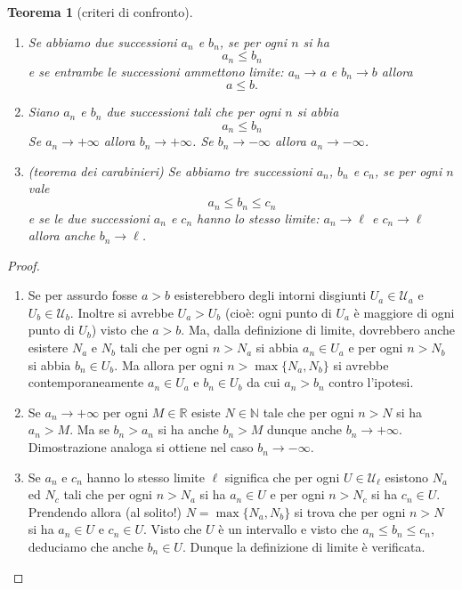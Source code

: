 \documentclass[italian,a4paper,oneside,headinclude]{scrbook}
\newcommand{\U}{\mathcal U}
\newcommand{\NN}{\mathbb N}
\newcommand{\RR}{\mathbb R}
\newtheorem{theorem}{Teorema}
\begin{document}
\begin{theorem}[criteri di confronto]
\begin{enumerate}
\item
Se abbiamo due successioni $a_n$ e $b_n$, se per ogni $n$ si ha
\[
a_n \le b_n
\]
e se entrambe le successioni ammettono limite: $a_n \to a$ e $b_n \to b$
allora
\[
a \le b.
\]

\item
Siano $a_n$ e $b_n$ due successioni tali che per ogni $n$
si abbia
\[
a_n \le b_n\]
Se $a_n \to +\infty$ allora $b_n \to +\infty$.
Se $b_n \to -\infty$ allora $a_n \to -\infty$.

\item
(teorema dei carabinieri)
Se abbiamo tre successioni $a_n$, $b_n$ e $c_n$,
se per ogni $n$ vale
\[
a_n \le b_n \le c_n
\]
 e se le due
successioni $a_n$ e $c_n$ hanno lo stesso limite: $a_n \to \ell$ e $c_n\to \ell$
allora anche $b_n \to \ell$.
\end{enumerate}


\end{theorem}
%
\begin{proof}
\begin{enumerate}
\item
Se per assurdo fosse $a > b$ esisterebbero degli intorni disgiunti $U_a\in \U_a$
e $U_b \in \U_b$.
Inoltre si avrebbe $U_a > U_b$ (cioè: ogni punto di $U_a$ è maggiore
di ogni punto di $U_b$) visto che $a>b$.
Ma, dalla definizione di limite,
dovrebbero anche esistere $N_a$ e $N_b$ tali che per ogni $n>N_a$ si abbia
$a_n \in U_a$ e per ogni $n>N_b$ si abbia $b_n \in U_b$.
Ma allora per ogni $n> \max\{N_a, N_b\}$ si avrebbe
contemporaneamente $a_n \in U_a$ e $b_n \in U_b$ da cui $a_n > b_n$
contro l'ipotesi.

\item
Se $a_n \to +\infty$ per ogni $M\in \RR$ esiste $N\in \NN$ tale che
per ogni $n>N$ si ha $a_n > M$. Ma se $b_n>a_n$ si ha anche $b_n >M$
dunque anche $b_n \to +\infty$.
Dimostrazione analoga si ottiene nel caso $b_n \to -\infty$.

\item
Se $a_n$ e $c_n$ hanno lo stesso limite $\ell$ significa che per ogni
$U \in \U_\ell$ esistono $N_a$ ed $N_c$ tali che per ogni $n>N_a$ si ha
$a_n\in U$ e per ogni $n > N_c$ si ha $c_n\in U$.
Prendendo allora (al solito!) $N=\max\{N_a, N_b\}$ si trova che per
ogni $n>N$ si ha $a_n\in U$ e $c_n \in U$.
Visto che $U$ è un intervallo e visto che $a_n \le b_n  \le c_n$,
deduciamo che anche $b_n \in U$. Dunque la definizione di limite è verificata.
\end{enumerate}
\end{proof}
\end{document}
